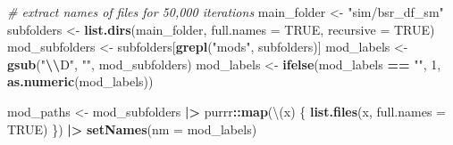 \documentclass[12pt, twoside]{amherstthesis}
\newenvironment{Shaded}{\begin{snugshade}}{\end{snugshade}}
\newcommand{\AttributeTok}[1]{\textcolor[rgb]{0.13,0.29,0.53}{#1}}
\newcommand{\CommentTok}[1]{\textcolor[rgb]{0.56,0.35,0.01}{\textit{#1}}}
\newcommand{\ConstantTok}[1]{\textcolor[rgb]{0.56,0.35,0.01}{#1}}
\newcommand{\DecValTok}[1]{\textcolor[rgb]{0.00,0.00,0.81}{#1}}
\newcommand{\FunctionTok}[1]{\textcolor[rgb]{0.13,0.29,0.53}{\textbf{#1}}}
\newcommand{\NormalTok}[1]{#1}
\newcommand{\OtherTok}[1]{\textcolor[rgb]{0.56,0.35,0.01}{#1}}
\newcommand{\SpecialCharTok}[1]{\textcolor[rgb]{0.81,0.36,0.00}{\textbf{#1}}}
\newcommand{\StringTok}[1]{\textcolor[rgb]{0.31,0.60,0.02}{#1}}
\begin{document}
\scriptsize
\begin{Shaded}
\begin{Highlighting}[]
\CommentTok{\# extract names of files for 50,000 iterations}
\NormalTok{main\_folder }\OtherTok{\textless{}{-}} \StringTok{"sim/bsr\_df\_sm"}
\NormalTok{subfolders }\OtherTok{\textless{}{-}} \FunctionTok{list.dirs}\NormalTok{(main\_folder, }\AttributeTok{full.names =} \ConstantTok{TRUE}\NormalTok{, }\AttributeTok{recursive =} \ConstantTok{TRUE}\NormalTok{)}
\NormalTok{mod\_subfolders }\OtherTok{\textless{}{-}}\NormalTok{ subfolders[}\FunctionTok{grepl}\NormalTok{(}\StringTok{"mods"}\NormalTok{, subfolders)]}
\NormalTok{mod\_labels }\OtherTok{\textless{}{-}} \FunctionTok{gsub}\NormalTok{(}\StringTok{"}\SpecialCharTok{\textbackslash{}\textbackslash{}}\StringTok{D"}\NormalTok{, }\StringTok{""}\NormalTok{, mod\_subfolders)}
\NormalTok{mod\_labels }\OtherTok{\textless{}{-}} \FunctionTok{ifelse}\NormalTok{(mod\_labels }\SpecialCharTok{==} \StringTok{""}\NormalTok{, }\DecValTok{1}\NormalTok{, }\FunctionTok{as.numeric}\NormalTok{(mod\_labels))}

\NormalTok{mod\_paths }\OtherTok{\textless{}{-}}\NormalTok{ mod\_subfolders }\SpecialCharTok{|\textgreater{}} 
\NormalTok{  purrr}\SpecialCharTok{::}\FunctionTok{map}\NormalTok{(\textbackslash{}(x) \{}
    \FunctionTok{list.files}\NormalTok{(x, }\AttributeTok{full.names =} \ConstantTok{TRUE}\NormalTok{)}
\NormalTok{  \}) }\SpecialCharTok{|\textgreater{}} 
  \FunctionTok{setNames}\NormalTok{(}\AttributeTok{nm =}\NormalTok{ mod\_labels)}


\end{Highlighting}
\end{Shaded}
\end{document}

